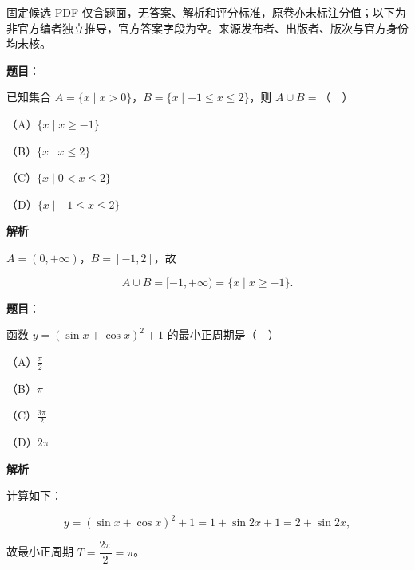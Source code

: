 

\begin{gktip}
固定候选 PDF 仅含题面，无答案、解析和评分标准，原卷亦未标注分值；以下为非官方编者独立推导，官方答案字段为空。来源发布者、出版者、版次与官方身份均未核。
\end{gktip}

\begin{answer}

\textbf{题目}：

已知集合 $A=\{x\mid x>0\}$，$B=\{x\mid -1\leqslant x\leqslant2\}$，则 $A\cup B=$（　）

（A）$\{x\mid x\geqslant-1\}$

（B）$\{x\mid x\leqslant2\}$

（C）$\{x\mid 0<x\leqslant2\}$

（D）$\{x\mid -1\leqslant x\leqslant2\}$

\textbf{解析}

$A=(0,+\infty)$，$B=[-1,2]$，故

\nopagebreak[4]
\[A\cup B=[-1,+\infty)=\{x\mid x\geqslant-1\}.\]


\end{answer}
\begin{answer}

\textbf{题目}：

函数 $y=(\sin x+\cos x)^2+1$ 的最小正周期是（　）

（A）$\frac{\pi}2$

（B）$\pi$

（C）$\frac{3\pi}2$

（D）$2\pi$

\textbf{解析}

计算如下：

\nopagebreak[4]
\[y=(\sin x+\cos x)^2+1=1+\sin2x+1=2+\sin2x,\]

故最小正周期 $T=\dfrac{2\pi}2=\pi$。


\end{answer}

